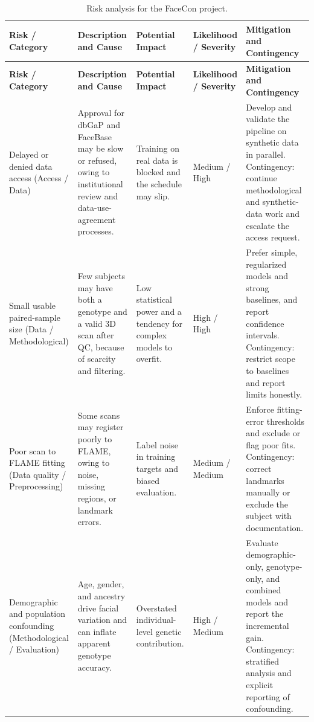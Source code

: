 {\footnotesize\setlength{\LTpre}{6pt}\setlength{\LTpost}{0pt}
\begin{longtable}{|P{2.5cm}|P{3.3cm}|P{2.5cm}|P{1.6cm}|P{3.0cm}|}
\caption{Risk analysis for the FaceCon project.}\label{tab:risk}\\
\hline
\textbf{Risk / Category} & \textbf{Description and Cause} & \textbf{Potential Impact} & \textbf{Likelihood / Severity} & \textbf{Mitigation and Contingency} \\ \hline
\endfirsthead
\hline
\textbf{Risk / Category} & \textbf{Description and Cause} & \textbf{Potential Impact} & \textbf{Likelihood / Severity} & \textbf{Mitigation and Contingency} \\ \hline
\endhead
\hline
\endfoot
Delayed or denied data access \newline (Access / Data) & Approval for dbGaP and FaceBase may be slow or refused, owing to institutional review and data-use-agreement processes. & Training on real data is blocked and the schedule may slip. & Medium / High & Develop and validate the pipeline on synthetic data in parallel. Contingency: continue methodological and synthetic-data work and escalate the access request. \\ \hline
Small usable paired-sample size \newline (Data / Methodological) & Few subjects may have both a genotype and a valid 3D scan after QC, because of scarcity and filtering. & Low statistical power and a tendency for complex models to overfit. & High / High & Prefer simple, regularized models and strong baselines, and report confidence intervals. Contingency: restrict scope to baselines and report limits honestly. \\ \hline
Poor scan to FLAME fitting \newline (Data quality / Preprocessing) & Some scans may register poorly to FLAME, owing to noise, missing regions, or landmark errors. & Label noise in training targets and biased evaluation. & Medium / Medium & Enforce fitting-error thresholds and exclude or flag poor fits. Contingency: correct landmarks manually or exclude the subject with documentation. \\ \hline
Demographic and population confounding \newline (Methodological / Evaluation) & Age, gender, and ancestry drive facial variation and can inflate apparent genotype accuracy. & Overstated individual-level genetic contribution. & High / Medium & Evaluate demographic-only, genotype-only, and combined models and report the incremental gain. Contingency: stratified analysis and explicit reporting of confounding. \\ \hline

\end{longtable}}
